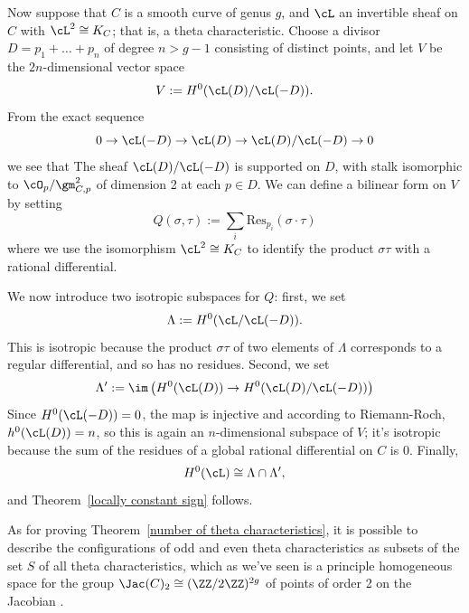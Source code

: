 
Now suppose that $C$ is a smooth curve of genus $g$, and $\cL$ an invertible sheaf on $C$ with $\cL^2 \cong K_C$; that is, a theta characteristic. Choose a divisor $D = p_1 + \dots + p_n$ of degree $n> g-1$ consisting of distinct points, and let $V$ be the $2n$-dimensional vector space
$$
V := H^0( \cL(D) / \cL(-D) ).
$$
From the exact sequence
$$
0\to \cL(-D) \to \cL(D) \to \cL(D)/\cL(-D) \to 0
$$
we see that 
The sheaf $ \cL(D) / \cL(-D)$ is supported on $D$, with stalk 
isomorphic to $\cO_p/\gm_{C,p}^2$ of dimension 2 at each $p \in D$. We can define a bilinear form on $V$ by setting
$$
Q(\sigma, \tau) := \sum_i \text{Res}_{p_i}(\sigma \cdot \tau)
$$
where we use the isomorphism $\cL^2 \cong K_C$ to identify the product $\sigma\tau$ with a rational differential.

We now introduce two isotropic subspaces for $Q$: first, we set
$$
\Lambda := H^0( \cL / \cL(-D) ).
$$
This is isotropic because the product $\sigma\tau$ of two elements of $\Lambda$ corresponds to a regular differential, and so has no residues.  Second, we set
$$
\Lambda' := \im\left( H^0(\cL(D)) \to H^0( \cL(D) / \cL(-D) ) \right)
$$
Since  $H^0(\cL(-D)) = 0$, the map is injective and according to Riemann-Roch, $h^0(\cL(D)) = n$, so this is again an $n$-dimensional subspace of $V$; it's isotropic because the sum of the residues of a global rational differential on $C$ is 0. Finally, 
$$
H^0(\cL) \cong \Lambda \cap \Lambda',
$$
and Theorem~\ref{locally constant sign} follows.

As for proving Theorem~\ref{number of theta characteristics}, it is possible to describe the configurations of odd and even theta characteristics as subsets of the set $S$ of all theta characteristics, which as we've seen is a principle homogeneous space for the group $\Jac(C)_2 \cong (\ZZ/2\ZZ)^{2g}$ of points of order 2 on the Jacobian \cite{JHPaper}. 


